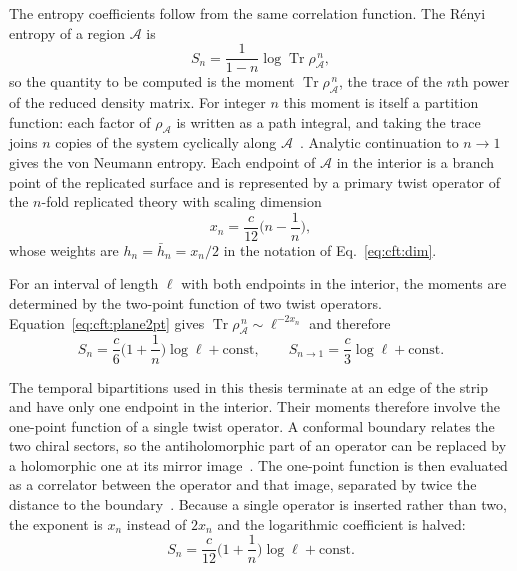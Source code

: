 The entropy coefficients follow from the same correlation function. The R\'enyi entropy of a region $\mathcal A$ is
\begin{equation}
  S_n = \frac{1}{1-n}\log\operatorname{Tr}\rho_{\mathcal A}^{\,n},
  \label{eq:cft:renyi}
\end{equation}
so the quantity to be computed is the moment $\operatorname{Tr}\rho_{\mathcal A}^{\,n}$, the trace of the $n$th power of the reduced density matrix. For integer $n$ this moment is itself a partition function: each factor of $\rho_{\mathcal A}$ is written as a path integral, and taking the trace joins $n$ copies of the system cyclically along $\mathcal A$~\cite{holzhey1994,calabrese_cardy2004}. Analytic continuation to $n\to1$ gives the von Neumann entropy. Each endpoint of $\mathcal A$ in the interior is a branch point of the replicated surface and is represented by a primary twist operator of the $n$-fold replicated theory with scaling dimension~\cite{calabrese_cardy2004}
\begin{equation}
  x_n = \frac{c}{12}\Big(n - \frac{1}{n}\Big),
  \label{eq:cft:twist}
\end{equation}
whose weights are $h_n=\bar h_n=x_n/2$ in the notation of Eq.~\eqref{eq:cft:dim}.

For an interval of length $\ell$ with both endpoints in the interior, the moments are determined by the two-point function of two twist operators. Equation~\eqref{eq:cft:plane2pt} gives $\operatorname{Tr}\rho_{\mathcal A}^{\,n}\sim\ell^{-2x_n}$ and therefore
\begin{equation}
  S_n = \frac{c}{6}\Big(1+\frac1n\Big)\log\ell + \text{const},
  \qquad
  S_{n\to1} = \frac{c}{3}\log\ell + \text{const}.
  \label{eq:cft:cc}
\end{equation}

The temporal bipartitions used in this thesis terminate at an edge of the strip and have only one endpoint in the interior. Their moments therefore involve the one-point function of a single twist operator. A conformal boundary relates the two chiral sectors, so the antiholomorphic part of an operator can be replaced by a holomorphic one at its mirror image~\cite{cardy1984}. The one-point function is then evaluated as a correlator between the operator and that image, separated by twice the distance to the boundary~\cite{calabrese_cardy2004}. Because a single operator is inserted rather than two, the exponent is $x_n$ instead of $2x_n$ and the logarithmic coefficient is halved:
\begin{equation}
  S_n = \frac{c}{12}\Big(1+\frac1n\Big)\log\ell + \text{const}.
  \label{eq:cft:cc_edge}
\end{equation}

